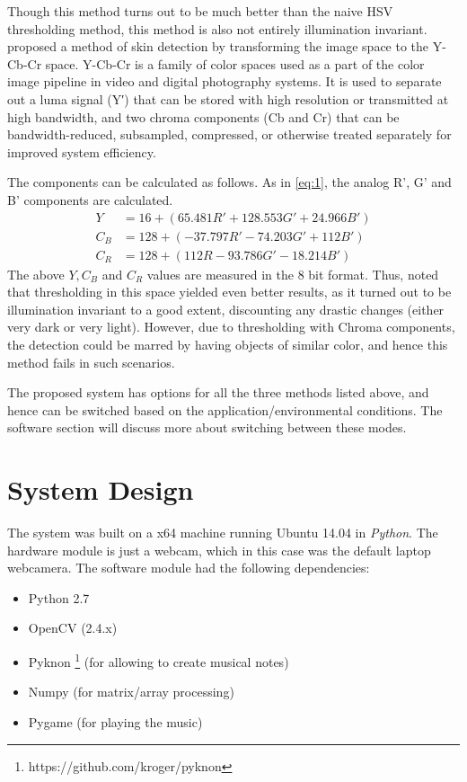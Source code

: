 \documentclass[letterpaper, 11 pt, twoside, conference]{ieeeconf}
\begin{document}
Though this method turns out to be much better than the naive HSV thresholding method, this method is
also not entirely illumination invariant. \cite{Chai1999} proposed a method of skin detection by transforming
the image space to the Y-Cb-Cr space. Y-Cb-Cr is a family of color spaces used as a part of the color image
pipeline in video and digital photography systems. It is used to separate out a luma signal (Y′) that can be 
stored with high resolution or transmitted at high bandwidth, and two chroma components (Cb and Cr) 
that can be bandwidth-reduced, subsampled, compressed, or otherwise treated separately for improved system efficiency.

The components can be calculated as follows. As in \ref{eq:1}, the analog R', G' and B' components are calculated.
\[
  \begin{split}
    Y &= 16 + (65.481R' + 128.553G' + 24.966B')
    \\
    C_B &= 128 + (-37.797R' - 74.203G' + 112B')
    \\
    C_R &= 128 + (112R - 93.786G' - 18.214B')
  \end{split}
\]
The above $Y,C_B$ and $C_R$ values are measured in the 8 bit format. Thus, \cite{Chai1999} noted that thresholding
in this space yielded even better results, as it turned out to be illumination invariant to a good extent,
discounting any drastic changes (either very dark or very light). However, due to thresholding with Chroma
components, the detection could be marred by having objects of similar color, and hence this method fails
in such scenarios.

The proposed system has options for all the three methods listed above, and hence can be switched based
on the application/environmental conditions. The software section will discuss more about switching between these modes.

\section{System Design}
The system was built on a x64 machine running Ubuntu 14.04 in \textit{Python}. The hardware module is just a webcam,
which in this case was the default laptop webcamera. The software module had the following dependencies:
\begin{itemize}
  \item Python 2.7
  \item OpenCV (2.4.x)
  \item Pyknon \footnote{https://github.com/kroger/pyknon} (for allowing to create musical notes)
  \item Numpy (for matrix/array processing)
  \item Pygame (for playing the music)
\end{itemize}
\end{document}
